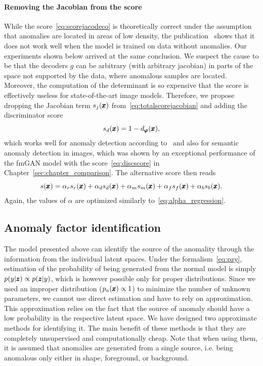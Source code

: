 \paragraph{Removing the Jacobian from the score} 
While the score~\eqref{eq:scorejacodeco} is theoretically correct under the assumption that anomalies are located in areas of low density, the publication~\cite{vsmidl2019anomaly} shows that it does not work well when the model is trained on data without anomalies. Our experiments shown below arrived at the same conclusion. We suspect the cause to be that the decoders $g$ can be arbitrary (with arbitrary jacobian) in parts of the space not supported by the data, where anomalous samples are located. Moreover, the computation of the determinant is so expensive that the score is effectively useless for state-of-the-art image models. Therefore, we propose dropping the Jacobian term $s_j(\pmb{{x}})$ from~\eqref{eq:totalscorejacobian} and adding the discriminator score
\begin{equation} \label{eq:discscore}
    s_d(\pmb{{x}}) = 1 - d_{\pmb{{\varphi}}}(\pmb{{x}}),
\end{equation}
which works well for anomaly detection according to~\cite{larsen2016autoencoding} and also for semantic anomaly detection in images, which was shown by an exceptional performance of the fmGAN model with the score~\eqref{eq:discscore} in Chapter~\ref{sec:chapter_comparison}. The alternative score then reads
\begin{equation} \label{eq:totalscoredisc}
    s(\pmb{{x}}) = \alpha_{r}  s_{r}(\pmb{{x}}) + \alpha_d s_d(\pmb{{x}}) + \alpha_m s_{m}(\pmb{{x}}) + \alpha_f s_{f}(\pmb{{x}}) + \alpha_b s_{b}(\pmb{{x}}).
\end{equation}
Again, the values of $\alpha$ are optimized similarly to~\eqref{eq:alpha_regression}.

\subsection{Anomaly factor identification}
\label{sec:anomaly_factor_identification}
The model presented above can identify the source of the anomality through the information from the individual latent spaces. Under the formalism~\eqref{eq:pzy}, estimation of the probability of being generated from the normal model is simply $p(y \vert \pmb{{z}})\propto p(\pmb{{z}} \vert y)$, which is however possible only for proper distributions. Since we used an improper distribution ($p_a(\pmb{{x}})\propto 1$) to minimize the number of unknown parameters, we cannot use direct estimation and have to rely on approximation. This approximation relies on the fact that the source of anomaly should have a low probability in the respective latent space. We have designed two approximate methods for identifying it. The main benefit of these methods is that they are completely unsupervised and computationally cheap. Note that when using them, it is assumed that anomalies are generated from a single source, i.e. being anomalous only either in shape, foreground, or background. 

